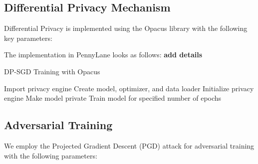\documentclass[11pt, conference]{IEEEtran}
\begin{document}

\subsection{Differential Privacy Mechanism}
Differential Privacy is implemented using the Opacus library with the following key parameters: %

The implementation in PennyLane looks as follows:
\textbf{add details}
\begin{algorithm}
\caption{DP-SGD Training with Opacus}
\begin{algorithmic}[1]
\STATE Import privacy engine
\STATE Create model, optimizer, and data loader
\STATE Initialize privacy engine
\STATE Make model private
\STATE Train model for specified number of epochs
\end{algorithmic}
\end{algorithm}

\subsection{Adversarial Training}
We employ the Projected Gradient Descent (PGD) attack for adversarial training with the following parameters: %
\end{document}

